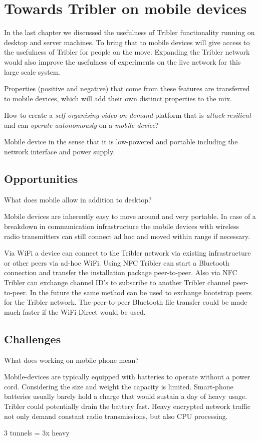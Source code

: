 \chapter{Towards Tribler on mobile devices}

In the last chapter we discussed the usefulness of Tribler functionality running on desktop and server machines.
To bring that to mobile devices will give access to the usefulness of Tribler for people on the move.
Expanding the Tribler network would also improve the usefulness of experiments on the live network for this large scale system.

Properties (positive and negative) that come from these features are transferred to mobile devices, which will add their own distinct properties to the mix.


How to create a \emph{self-organising} \emph{video-on-demand} platform that is \emph{attack-resilient} and can \emph{operate autonomously} on a \emph{mobile device}?

Mobile device in the sense that it is low-powered and portable including the network interface and power supply.



\section{Opportunities}

What does mobile allow in addition to desktop?

Mobile devices are inherently easy to move around and very portable.
In case of a breakdown in communication infrastructure the mobile devices with wireless radio transmitters can still connect ad hoc and moved within range if necessary.

Via WiFi a device can connect to the Tribler network via existing infrastructure or other peers via ad-hoc WiFi.
Using NFC Tribler can start a Bluetooth connection and transfer the installation package peer-to-peer.
Also via NFC Tribler can exchange channel ID's to subscribe to another Tribler channel peer-to-peer.
In the future the same method can be used to exchange bootstrap peers for the Tribler network.
The peer-to-peer Bluetooth file transfer could be made much faster if the WiFi Direct would be used.


\section{Challenges}

What does working on mobile phone mean?

Mobile-devices are typically equipped with batteries to operate without a power cord.
Considering the size and weight the capacity is limited.
Smart-phone batteries usually barely hold a charge that would sustain a day of heavy usage.
Tribler could potentially drain the battery fast.
Heavy encrypted network traffic not only demand constant radio transmissions, but also CPU processing.


3 tunnels = 3x heavy